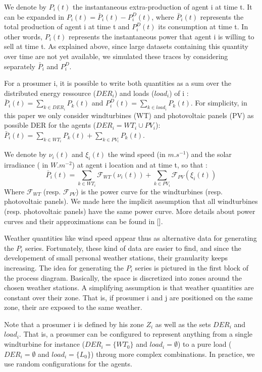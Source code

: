 \documentclass[conference]{IEEEtran}
\begin{document}
We denote by $ P_{i}(t) $ the instantaneous extra-production of agent i at time t. It can be expanded in $ P_{i}(t) = \bar{P}_{i}(t) - P_{i}^{D}(t) $, where $ \bar{P}_{i}(t) $ represents the total production of agent i at time t and $ P_{i}^{D}(t) $ its consumption at time t. In other words, $ P_{i}(t) $ represents the instantaneous power that agent i is willing to sell at time t. As explained above, since large datasets containing this quantity over time are not yet available, we simulated these traces by considering separately $ \bar{P}_{i} $ and $ P_{i}^{D} $.

For a prosumer i, it is possible to write both quantities as a sum over the distributed energy ressource ($ DER_{i} $) and loads ($ load_{i} $) of i : $ \bar{P}_{i}(t) = \sum_{k \in DER_{i}} P_{k}(t) $ and $ P_{i}^{D}(t) = \sum_{k \in load_{i}} P_{k}(t) $. For simplicity, in this paper we only consider windturbines (WT) and photovoltaic panels (PV) as possible DER for the agents ($ DER_{i} = WT_{i} \cup PV_{i} $):  $ \bar{P}_{i}(t) = \sum_{k \in WT_{i}} P_{k}(t) + \sum_{k \in PV_{i}} P_{k}(t) $. 

We denote by $ \nu_{i}(t) $ and $ \xi_{i}(t) $ the wind speed (in $ m.s^{-1} $) and the solar irradiance ( in $ W.m^{-2} $) at agent i location and at time t, so that :
\begin{equation}
 \bar{P}_{i}(t) = \sum_{k \in WT_{i}} \mathcal{F}_{WT}( \nu_{i}(t) ) + \sum_{k \in PV_{i} } \mathcal{F}_{PV}(\xi_{i}(t) ) 
\end{equation}
Where $ \mathcal{F}_{WT} $ (resp. $ \mathcal{F}_{PV} $) is the power curve for the windturbines (resp. photovoltaic panels). We made here the implicit assumption that all windturbines (resp. photovoltaic panels) have the same power curve. More details about power curves and their approximations can be found in []. 

Weather quantities like wind speed appear thus as alternative data for generating the $ P_{i} $ series. Fortunately, these kind of data are easier to find, and since the developement of small personal weather stations, their granularity keeps increasing. The idea for generating the $ P_{i} $ series is pictured in the first block of the process diagram. Basically, the space is discretized into zones around the chosen weather stations. A simplifying assumption is that weather quantities are constant over their zone. That is, if prosumer i and j are positioned on the same zone, their are exposed to the same weather. 

Note that a prosumer i is defined by his zone $ Z_{i} $ as well as the sets $ DER_{i} $ and $ load_{i} $. That is, a prosumer can be configured to represent anything from a single windturbine for instance ($ DER_{i} = \{ WT_{0} \} $ and $ load_{i} = \emptyset $) to a pure load ($ DER_{i} = \emptyset $ and $ load_{i} = \{ L_{0} \} $) throug more complex combinations. In practice, we use random configurations for the agents.
\end{document}
